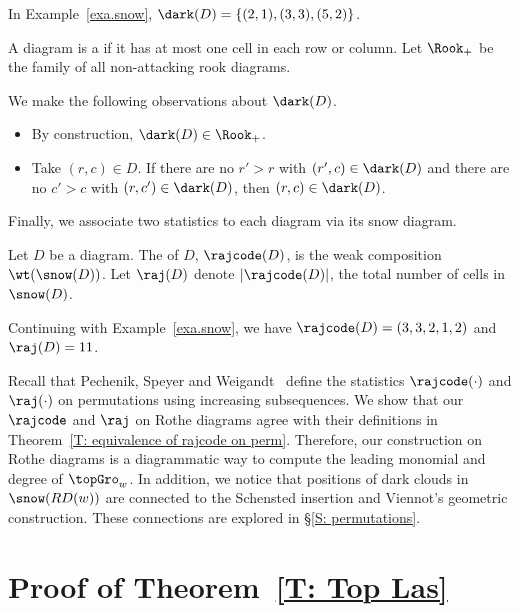 \begin{exa}
In Example~\ref{exa.snow},
$\dark(D) = \{(2,1), (3,3), (5,2) \}$.
\end{exa}

A diagram is a 
if it has at most one cell in each row or column.
Let $\Rook_+$ be the family
of all non-attacking rook diagrams.  


\begin{rem}
\label{R: Basic of dark}
We make the following observations about $\dark(D)$.
\begin{itemize}
\item By construction, $\dark(D) \in \Rook_+$.
\item Take $(r,c) \in D$.
If there are no $r' > r$ with $(r', c) \in \dark(D)$ 
and there are no $c' > c$ with $(r, c') \in \dark(D)$,
then $(r,c) \in \dark(D)$.
\end{itemize}
\end{rem}

Finally, we associate two statistics
to each diagram via its snow diagram.

\begin{defn}\label{defn.raj}
Let $D$ be a diagram.
The  of $D$,
$\rajcode(D)$, 
is the weak composition $\wt(\snow(D))$.
Let $\raj(D)$ denote $|\rajcode(D)|$,
the total number of cells in $\snow(D)$.
\end{defn}

\begin{exa}
Continuing with Example~\ref{exa.snow}, we have $\rajcode(D) = (3,3,2,1,2)$ and $\raj(D) = 11$.
\end{exa}

\begin{rem}
Recall that Pechenik, Speyer and Weigandt~\cite{PSW} 
define the statistics $\rajcode(\cdot)$ and $\raj(\cdot)$ on permutations
using increasing subsequences. 
We show that our $\rajcode$ and $\raj$ on Rothe diagrams 
agree with their definitions in Theorem~\ref{T: equivalence of rajcode on perm}.
Therefore, our construction on Rothe diagrams is a diagrammatic way
to compute the leading monomial and degree of $\topGro_w$.
In addition, we notice that positions of dark clouds in $\snow(RD(w))$
are connected to the Schensted insertion and Viennot's geometric construction.
These connections are explored in \S\ref{S: permutations}.
\end{rem}


\section{Proof of Theorem~\ref{T: Top Las}}
\label{S: weak composition}

